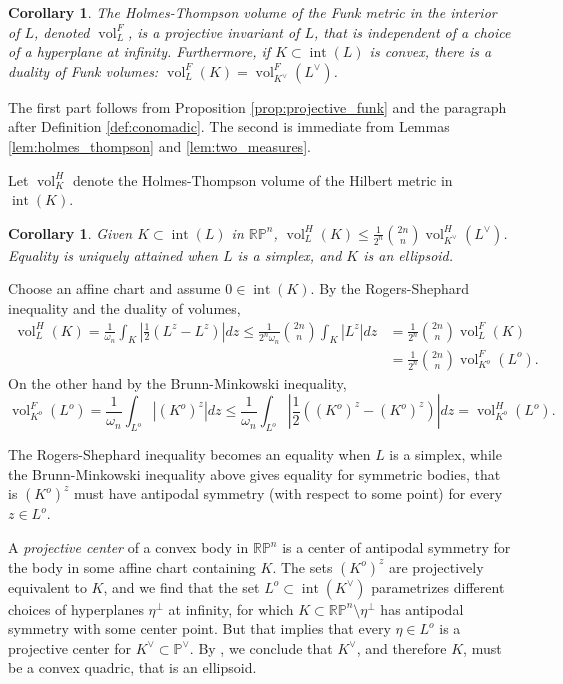 \documentclass[reqno,10pt]{amsart}
\newcounter{mp}
\newtheorem{Corollary}[Proposition]{Corollary}
\DeclareMathOperator{\inter}{int}
\DeclareMathOperator{\vol}{vol}
\newcommand{\R}{\mathbb{R}}
\newcommand{\PP}{\mathbb{P}}
\begin{document}
\begin{Corollary}\label{cor:dual_volumes}
The Holmes-Thompson volume of the Funk metric in the interior of $L$, denoted $\vol^F_L$, is a projective invariant of $L$, that is independent of a choice of a hyperplane at infinity. Furthermore, if $K\subset\inter(L)$ is convex, there is a duality of Funk volumes: $\vol_L^F(K)=\vol_{K^\vee}^F(L^\vee)$.
\end{Corollary}
\proof
The first part follows from Proposition \ref{prop:projective_funk} and the paragraph after Definition \ref{def:conomadic}. The second is immediate from Lemmas \ref{lem:holmes_thompson} and \ref{lem:two_measures}.
\endproof


Let $\vol^H_K$ denote the Holmes-Thompson volume of the Hilbert metric in $\inter(K)$.
\begin{Corollary}\label{cor:hilbert_volume_sec3} Given $K\subset \inter(L)$ in $\R\PP^n$,
	$\vol^H_L(K)\leq\frac{1}{2^n}{2n\choose n} \vol_{K^\vee}^H(L^\vee)$. Equality is uniquely attained when $L$ is a simplex, and $K$ is an ellipsoid.
\end{Corollary}
\proof
Choose an affine chart and assume $0\in\inter(K)$.
By the Rogers-Shephard inequality and the duality of volumes,
\begin{align*}\vol^H_L(K)=\frac{1}{\omega_n}\int_K|\frac12 (L^z-L^z)|dz\leq \frac1{2^n\omega_n}{2n\choose n}\int_K |L^z|dz&=\frac1{2^n}{2n\choose n}\vol^F_{L}(K)\\&=\frac1{2^n}{2n\choose n}\vol^F_{K^o}(L^o).\end{align*}
On the other hand by the Brunn-Minkowski inequality,
$$\vol^F_{K^o}(L^o)=\frac{1}{\omega_n}\int_{L^o}|(K^o)^z|dz\leq \frac{1}{\omega_n}\int_{L^o}|\frac12 ((K^o)^z-(K^o)^z)|dz=\vol^H_{K^o}(L^o).$$

The Rogers-Shephard inequality becomes an equality when $L$ is a simplex, while the Brunn-Minkowski  inequality above gives equality for symmetric bodies, that is $(K^o)^z$ must have antipodal symmetry (with respect to some point) for every $z\in L^o$. 

A \emph{projective center} of a convex body in $\R\PP^n $ is a center of antipodal symmetry for the body in some affine chart containing $K$.
The sets $(K^o)^z$ are projectively equivalent to $K$, and we find that the set $L^o\subset \inter(K^\vee)$ parametrizes different choices of hyperplanes $\eta^\perp$ at infinity, for which $K\subset\R\PP^n\setminus \eta^\perp$ has antipodal symmetry with some center point. But that implies that every $\eta\in L^o$ is a projective center for $K^\vee\subset\PP^\vee$. By \cite[Theorem 9-3.]{kelly_straus}, we conclude that $K^\vee$, and therefore $K$, must be a convex quadric, that is an ellipsoid.
\endproof
\end{document}
